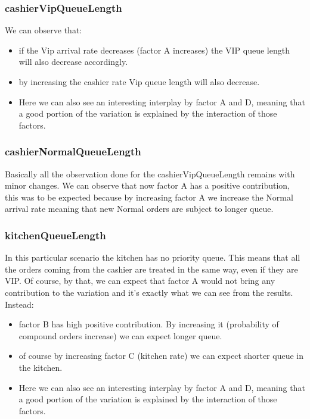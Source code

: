 \subsubsection{cashierVipQueueLength}


We can observe that:
\begin{itemize}
    \item if the Vip arrival rate decreases (factor A increases) the VIP queue length will also decrease accordingly.
    \item by increasing the cashier rate Vip queue length will also decrease.
    \item Here we can also see an interesting interplay by factor A and D, meaning that a good portion of the variation is explained by the interaction of those factors.
\end{itemize}

\subsubsection{cashierNormalQueueLength}


Basically all the observation done for the cashierVipQueueLength remains with minor changes. We can observe that now factor A has a positive contribution, this was to be expected because by increasing factor A we increase the Normal arrival rate meaning that new Normal orders are subject to longer queue.

\subsubsection{kitchenQueueLength}



In this particular scenario the kitchen has no priority queue. This means that all the orders coming from the cashier are treated in the same way, even if they are VIP. Of course, by that, we can expect that factor A would not bring any contribution to the variation and it's exactly what we can see from the results. Instead:
\begin{itemize}
    \item factor B has high positive contribution. By increasing it (probability of compound orders increase) we can expect longer queue.
    \item of course by increasing factor C (kitchen rate) we can expect shorter queue in the kitchen.
    \item Here we can also see an interesting interplay by factor A and D, meaning that a good portion of the variation is explained by the interaction of those factors.
\end{itemize}


